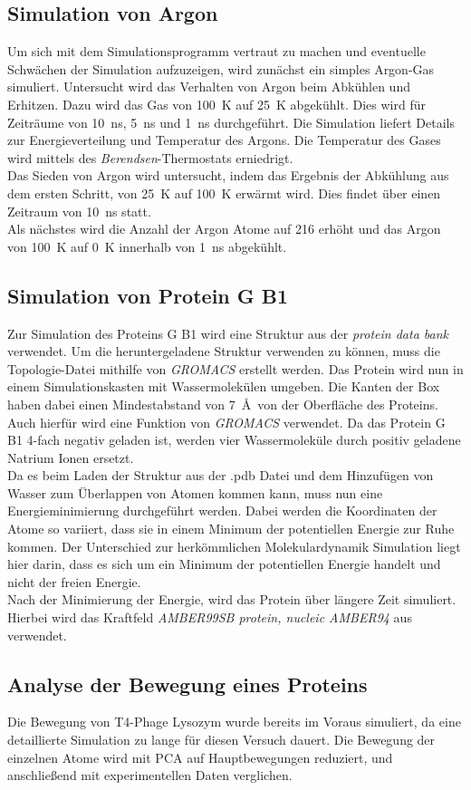 \subsection{Simulation von Argon}
Um sich mit dem Simulationsprogramm vertraut zu machen und eventuelle Schwächen der Simulation aufzuzeigen, wird zunächst ein simples Argon-Gas simuliert.
Untersucht wird das Verhalten von Argon beim Abkühlen und Erhitzen.
Dazu wird das Gas von 100~K auf 25~K abgekühlt. Dies wird für Zeiträume von 10~ns, 5~ns und 1~ns durchgeführt. Die Simulation liefert Details zur Energieverteilung und Temperatur des Argons.
Die Temperatur des Gases wird mittels des \emph{Berendsen}-Thermostats \cite{berendsen} erniedrigt.
\\ \noindent
Das Sieden von Argon wird untersucht, indem das Ergebnis der Abkühlung aus dem ersten Schritt, von 25~K auf 100~K erwärmt wird. Dies findet über einen Zeitraum von 10~ns statt.
\\ \noindent
Als nächstes wird die Anzahl der Argon Atome auf 216 erhöht und das Argon von 100~K auf 0~K innerhalb von 1~ns abgekühlt.

\subsection{Simulation von Protein G B1}
Zur Simulation des Proteins G B1 wird eine Struktur aus der \emph{protein data bank} verwendet. Um die heruntergeladene Struktur verwenden zu können, muss die Topologie-Datei mithilfe von \emph{GROMACS} erstellt werden.
Das Protein wird nun in einem Simulationskasten mit Wassermolekülen umgeben. Die Kanten der Box haben dabei einen Mindestabstand von 7~\AA ~von der Oberfläche des Proteins. Auch hierfür wird eine Funktion von \emph{GROMACS} verwendet.
Da das Protein G B1 4-fach negativ geladen ist, werden vier Wassermoleküle durch positiv geladene Natrium Ionen ersetzt.
\\ \noindent
Da es beim Laden der Struktur aus der .pdb Datei und dem Hinzufügen von Wasser zum Überlappen von Atomen kommen kann, muss nun eine Energieminimierung durchgeführt werden. Dabei werden die Koordinaten der Atome so variiert, dass sie in einem Minimum der potentiellen Energie zur Ruhe kommen.
Der Unterschied zur herkömmlichen Molekulardynamik Simulation liegt hier darin, dass es sich um ein Minimum der potentiellen Energie handelt und nicht der freien Energie.
\\ \noindent
Nach der Minimierung der Energie, wird das Protein über längere Zeit simuliert. Hierbei wird das Kraftfeld \emph{AMBER99SB protein, nucleic AMBER94} aus \cite{PROT} verwendet.

\subsection{Analyse der Bewegung eines Proteins}
Die Bewegung von T4-Phage Lysozym wurde bereits im Voraus simuliert, da eine detaillierte Simulation zu lange für diesen Versuch dauert.
Die Bewegung der einzelnen Atome wird mit PCA auf Hauptbewegungen reduziert, und anschließend mit experimentellen Daten verglichen.
